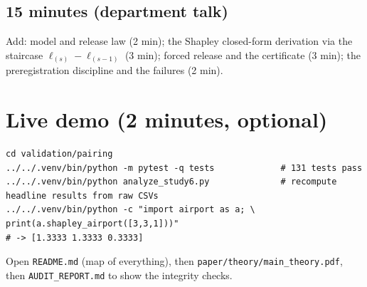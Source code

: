 \documentclass[11pt]{article}
\begin{document}
\subsection*{15 minutes (department talk)}
Add: model and release law (2 min); the Shapley closed-form derivation via the staircase $\ell_{(s)}-\ell_{(s-1)}$ (3 min); forced release and the certificate (3 min); the preregistration discipline and the failures (2 min).

\section{Live demo (2 minutes, optional)}
\begin{verbatim}
cd validation/pairing
../../.venv/bin/python -m pytest -q tests             # 131 tests pass
../../.venv/bin/python analyze_study6.py              # recompute headline results from raw CSVs
../../.venv/bin/python -c "import airport as a; \
print(a.shapley_airport([3,3,1]))"
# -> [1.3333 1.3333 0.3333]
\end{verbatim}
Open \texttt{README.md} (map of everything), then \texttt{paper/theory/main\_theory.pdf}, then \texttt{AUDIT\_REPORT.md} to show the integrity checks.
\end{document}
